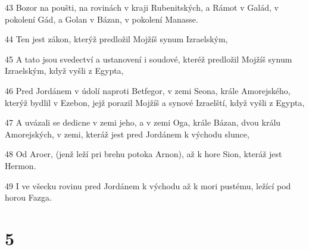 \par 43 Bozor na poušti, na rovinách v kraji Rubenitských, a Rámot v Galád, v pokolení Gád, a Golan v Bázan, v pokolení Manasse.
\par 44 Ten jest zákon, kterýž predložil Mojžíš synum Izraelským,
\par 45 A tato jsou svedectví a ustanovení i soudové, kteréž predložil Mojžíš synum Izraelským, když vyšli z Egypta,
\par 46 Pred Jordánem v údolí naproti Betfegor, v zemi Seona, krále Amorejského, kterýž bydlil v Ezebon, jejž porazil Mojžíš a synové Izraelští, když vyšli z Egypta,
\par 47 A uvázali se dedicne v zemi jeho, a v zemi Oga, krále Bázan, dvou králu Amorejských, v zemi, kteráž jest pred Jordánem k východu slunce,
\par 48 Od Aroer, (jenž leží pri brehu potoka Arnon), až k hore Sion, kteráž jest Hermon.
\par 49 I ve všecku rovinu pred Jordánem k východu až k mori pustému, ležící pod horou Fazga.

\chapter{5}

